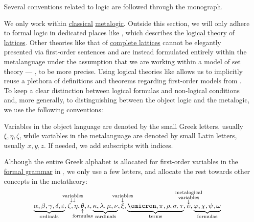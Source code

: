 \begin{remark}\label{rem:mathematical_logic_conventions}
  Several conventions related to logic are followed through the monograph.

  We only work within \hyperref[def:classical_logic]{classical} \hyperref[con:metalogic]{metalogic}. Outside this section, we will only adhere to formal logic in dedicated places like , which describes the \hyperref[def:logical_theory]{logical theory} of \hyperref[def:lattice]{lattices}. Other theories like that of \hyperref[def:complete_lattice]{complete lattices} cannot be elegantly presented via first-order sentences and are instead formulated entirely within the metalanguage under the assumption that we are working within a model of set theory --- \hyperref[def:axiom_of_universes]{}, to be more precise. Using logical theories like  allows us to implicitly reuse a plethora of definitions and theorems regarding first-order models from . To keep a clear distinction between logical formulas and non-logical conditions and, more generally, to distinguishing between the object logic and the metalogic, we use the following conventions:

  \begin{thmenum}
     Variables in the object language are denoted by the small Greek letters, usually \( \xi, \eta, \zeta \), while variables in the metalanguage are denoted by small Latin letters, usually \( x, y, z \). If needed, we add subscripts with indices.

     Although the entire Greek alphabet is allocated for first-order variables in the \hyperref[def:formal_grammar]{formal grammar} in , we only use a few letters, and allocate the rest towards other concepts in the metatheory:
    \begin{equation*}
      \underbrace{\alpha, \beta, \gamma, \delta, \varepsilon}_{\T{ordinals}},
      \overset{ \mathclap{ \substack{ \T{variables} \\ \downarrow \downarrow } } }{\zeta, \eta},
      \underset{ \mathclap{ \substack{ \uparrow \\ \T{formulas} } } }{\theta},
      \iota,
      \underbrace{\kappa, \lambda, \mu, \nu}_{\T{cardinals}},
      \overset{ \mathclap{ \substack{ \T{variables} \\ \downarrow } } }{\xi},
      \underbrace{\omicron, \pi, \rho, \sigma, \tau}_{\T{terms}},
      \overset{ \mathclap{ \substack{ \T{metalogical} \\ \T{variables} \\ \downarrow } } }{\upsilon},
      \underbrace{\varphi, \chi, \psi, \omega}_{\T{formulas}}
    \end{equation*}


\end{thmenum}
\end{remark}
